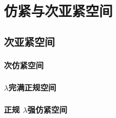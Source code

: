 \documentclass[main.tex]{subfiles}
\begin{document}
\part{仿紧与次亚紧空间}\label{part2}

\chapter{次亚紧空间}\label{ch4}

\section{次仿紧空间}\label{sec:4.1}
	
	
\section{$\lambda$完满正规空间}\label{sec:4.2}
	
	
\section{正规	$\lambda$强仿紧空间}\label{sec:4.3}
	
\end{document}

